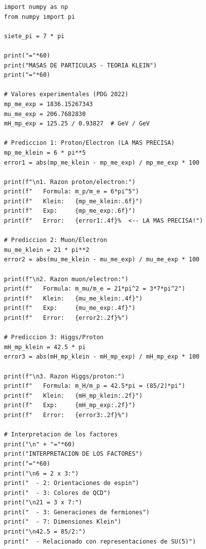 \documentclass[12pt,a4paper,openany]{book}
\begin{document}
\begin{nivelcodigo}

\begin{lstlisting}[caption={Verificación de masas de partículas}]
import numpy as np
from numpy import pi

siete_pi = 7 * pi

print("="*60)
print("MASAS DE PARTICULAS - TEORIA KLEIN")
print("="*60)

# Valores experimentales (PDG 2022)
mp_me_exp = 1836.15267343
mu_me_exp = 206.7682830
mH_mp_exp = 125.25 / 0.93827  # GeV / GeV

# Prediccion 1: Proton/Electron (LA MAS PRECISA)
mp_me_klein = 6 * pi**5
error1 = abs(mp_me_klein - mp_me_exp) / mp_me_exp * 100

print(f"\n1. Razon proton/electron:")
print(f"   Formula: m_p/m_e = 6*pi^5")
print(f"   Klein:   {mp_me_klein:.6f}")
print(f"   Exp:     {mp_me_exp:.6f}")
print(f"   Error:   {error1:.4f}%  <-- LA MAS PRECISA!")

# Prediccion 2: Muon/Electron
mu_me_klein = 21 * pi**2
error2 = abs(mu_me_klein - mu_me_exp) / mu_me_exp * 100

print(f"\n2. Razon muon/electron:")
print(f"   Formula: m_mu/m_e = 21*pi^2 = 3*7*pi^2")
print(f"   Klein:   {mu_me_klein:.4f}")
print(f"   Exp:     {mu_me_exp:.4f}")
print(f"   Error:   {error2:.2f}%")

# Prediccion 3: Higgs/Proton
mH_mp_klein = 42.5 * pi
error3 = abs(mH_mp_klein - mH_mp_exp) / mH_mp_exp * 100

print(f"\n3. Razon Higgs/proton:")
print(f"   Formula: m_H/m_p = 42.5*pi = (85/2)*pi")
print(f"   Klein:   {mH_mp_klein:.2f}")
print(f"   Exp:     {mH_mp_exp:.2f}")
print(f"   Error:   {error3:.2f}%")

# Interpretacion de los factores
print("\n" + "="*60)
print("INTERPRETACION DE LOS FACTORES")
print("="*60)
print("\n6 = 2 x 3:")
print("  - 2: Orientaciones de espin")
print("  - 3: Colores de QCD")
print("\n21 = 3 x 7:")
print("  - 3: Generaciones de fermiones")
print("  - 7: Dimensiones Klein")
print("\n42.5 = 85/2:")
print("  - Relacionado con representaciones de SU(5)")
\end{lstlisting}

\end{nivelcodigo}

\end{document}
